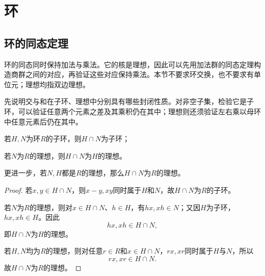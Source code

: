 \setchapterimage{}
\chapter{环}
\label{p2:ch3}

\section{环的同态定理}

环的同态同时保持加法与乘法。它的核是理想，因此可以先用加法群的同态定理构造商群之间的对应，再验证这些对应保持乘法。本节不要求环交换，也不要求有单位元；理想均指双边理想。

先说明交与和在子环、理想中分别具有哪些封闭性质。对非空子集，检验它是子环，可以验证任意两个元素之差及其乘积仍在其中；理想则还须验证左右乘以母环中任意元素后仍在其中。

\begin{proposition}
若$H,N$为环$R$的子环，则$H\cap N$为子环；

若$N$为$R$的理想，则$H\cap N$为$H$的理想。

更进一步，若$N,H$都是$R$的理想，那么$H\cap N$为$R$的理想。


\end{proposition}
\begin{proof}
若$x,y\in H\cap N$，则$x-y,xy$同时属于$H$和$N$，故$H\cap N$为$R$的子环。

若$N$为$R$的理想，则对$x\in H\cap N$、$h\in H$，有$hx,xh\in N$；又因$H$为子环，$hx,xh\in H$。因此
\[
hx,xh\in H\cap N,
\]
即$H\cap N$为$H$的理想。

若$H,N$均为$R$的理想，则对任意$r\in R$和$x\in H\cap N$，$rx,xr$同时属于$H$与$N$，所以
\[
rx,xr\in H\cap N.
\]
故$H\cap N$为$R$的理想。


\end{proof}


